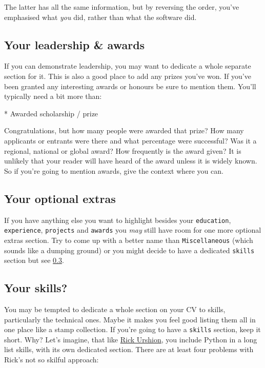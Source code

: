 \documentclass[
]{book}
\newenvironment{Shaded}{\begin{snugshade}}{\end{snugshade}}
\newcommand{\NormalTok}[1]{#1}
\newcommand{\SpecialStringTok}[1]{\textcolor[rgb]{0.31,0.60,0.02}{#1}}
\begin{document}
The latter has all the same information, but by reversing the order, you've emphasised what \emph{you} did, rather than what the software did.

\hypertarget{prizes}{%
\subsection{Your leadership \& awards}\label{prizes}}

If you can demonstrate leadership, you may want to dedicate a whole separate section for it. This is also a good place to add any prizes you've won. If you've been granted any interesting awards or honours be sure to mention them. You'll typically need a bit more than:

\begin{Shaded}
\begin{Highlighting}[]
\SpecialStringTok{* }\NormalTok{Awarded scholarship / prize}
\end{Highlighting}
\end{Shaded}

Congratulations, but how many people were awarded that prize? How many applicants or entrants were there and what percentage were successful? Was it a regional, national or global award? How frequently is the award given? It is unlikely that your reader will have heard of the award unless it is widely known. So if you're going to mention awards, give the context where you can.

\hypertarget{misc}{%
\subsection{Your optional extras}\label{misc}}

If you have anything else you want to highlight besides your \texttt{education}, \texttt{experience}, \texttt{projects} and \texttt{awards} you \emph{may} still have room for one more optional extras section. Try to come up with a better name than \texttt{Miscellaneous} (which sounds like a dumping ground) or you might decide to have a dedicated \texttt{skills} section but see \ref{mycvsk}.

\hypertarget{mycvsk}{%
\subsection{Your skills?}\label{mycvsk}}

You may be tempted to dedicate a whole section on your CV to skills, particularly the technical ones. Maybe it makes you feel good listing them all in one place like a stamp collection. If you're going to have a \texttt{skills} section, keep it short. Why? Let's imagine, that like \href{Rick_Urshion.pdf}{Rick Urshion}, you include Python in a long list skills, with its own dedicated section. There are at least four problems with Rick's not so skilful approach:
\end{document}
